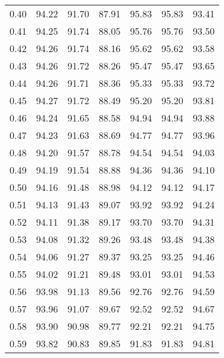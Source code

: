 \begin{tabular}{|c|c|c|c|c|c|c|}
      0.40 &     94.22 &     91.70 &      87.91 &   95.83 &      95.83 &         93.41 \\
      0.41 &     94.25 &     91.74 &      88.05 &   95.76 &      95.76 &         93.50 \\
      0.42 &     94.26 &     91.74 &      88.16 &   95.62 &      95.62 &         93.58 \\
      0.43 &     94.26 &     91.72 &      88.26 &   95.47 &      95.47 &         93.65 \\
      0.44 &     94.26 &     91.71 &      88.36 &   95.33 &      95.33 &         93.72 \\
      0.45 &     94.27 &     91.72 &      88.49 &   95.20 &      95.20 &         93.81 \\
      0.46 &     94.24 &     91.65 &      88.58 &   94.94 &      94.94 &         93.88 \\
      0.47 &     94.23 &     91.63 &      88.69 &   94.77 &      94.77 &         93.96 \\
      0.48 &     94.20 &     91.57 &      88.78 &   94.54 &      94.54 &         94.03 \\
      0.49 &     94.19 &     91.54 &      88.88 &   94.36 &      94.36 &         94.10 \\
      0.50 &     94.16 &     91.48 &      88.98 &   94.12 &      94.12 &         94.17 \\
      0.51 &     94.13 &     91.43 &      89.07 &   93.92 &      93.92 &         94.24 \\
      0.52 &     94.11 &     91.38 &      89.17 &   93.70 &      93.70 &         94.31 \\
      0.53 &     94.08 &     91.32 &      89.26 &   93.48 &      93.48 &         94.38 \\
      0.54 &     94.06 &     91.27 &      89.37 &   93.25 &      93.25 &         94.46 \\
      0.55 &     94.02 &     91.21 &      89.48 &   93.01 &      93.01 &         94.53 \\
      0.56 &     93.98 &     91.13 &      89.56 &   92.76 &      92.76 &         94.59 \\
      0.57 &     93.96 &     91.07 &      89.67 &   92.52 &      92.52 &         94.67 \\
      0.58 &     93.90 &     90.98 &      89.77 &   92.21 &      92.21 &         94.75 \\
      0.59 &     93.82 &     90.83 &      89.85 &   91.83 &      91.83 &         94.81 \\

\end{tabular}
